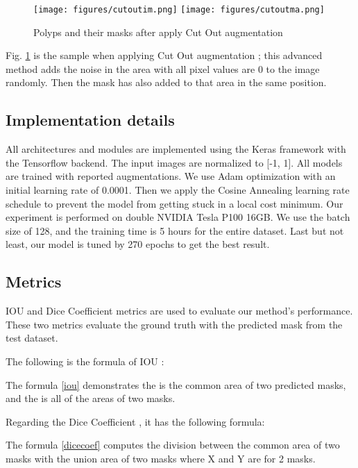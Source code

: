 \documentclass[conference]{IEEEtran}
\begin{document}
\begin{figure} [H]
    \centering
    \texttt{[image: figures/cutoutim.png]}
    \texttt{[image: figures/cutoutma.png]}
    \caption{Polyps and their masks after apply Cut Out augmentation}  
    \label{fig:cutout}
\end{figure}

\vspace{1mm}

Fig. \ref{fig:cutout} is the sample when applying Cut Out augmentation \cite{devries2017improved}; this advanced method adds the noise in the area with all pixel values are 0 to the image randomly. Then the mask has also added to that area in the same position.
\subsection{Implementation details}
All architectures and modules are implemented using the Keras framework with the Tensorflow backend. The input images are normalized to [-1, 1]. All models are trained with reported augmentations. We use Adam optimization \cite{kingma2014adam} with an initial learning rate of 0.0001. Then we apply the Cosine Annealing learning rate schedule to prevent the model from getting stuck in a local cost minimum. Our experiment is performed on double NVIDIA Tesla P100 16GB. We use the batch size of 128, and the training time is 5 hours for the entire dataset. Last but not least, our model is tuned by 270 epochs to get the best result.


\vspace{-4mm}
\subsection{Metrics}


IOU and Dice Coefficient metrics are used to evaluate our method's performance. These two metrics evaluate the ground truth with the predicted mask from the test dataset.

The following is the formula of IOU \cite{iou}:


The formula \ref{iou} demonstrates the  is the common area of two predicted masks, and the  is all of the areas of two masks.

Regarding the Dice Coefficient \cite{dicecoef}, it has the following formula:


The formula \ref{dicecoef} computes the division between the common area of two masks with the union area of two masks where X and Y are for 2 masks.
\end{document}
